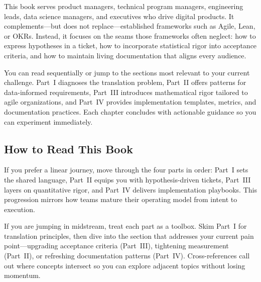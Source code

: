 \documentclass[11pt,a4paper,twoside,openright]{book}
\begin{document}
This book serves product managers, technical program managers, engineering leads, data science managers, and executives who drive digital products. It complements—but does not replace—established frameworks such as Agile, Lean, or OKRs. Instead, it focuses on the seams those frameworks often neglect: how to express hypotheses in a ticket, how to incorporate statistical rigor into acceptance criteria, and how to maintain living documentation that aligns every audience.

You can read sequentially or jump to the sections most relevant to your current challenge. Part~I diagnoses the translation problem, Part~II offers patterns for data-informed requirements, Part~III introduces mathematical rigor tailored to agile organizations, and Part~IV provides implementation templates, metrics, and documentation practices. Each chapter concludes with actionable guidance so you can experiment immediately.

\subsection*{How to Read This Book}
If you prefer a linear journey, move through the four parts in order: Part~I sets the shared language, Part~II equips you with hypothesis-driven tickets, Part~III layers on quantitative rigor, and Part~IV delivers implementation playbooks. This progression mirrors how teams mature their operating model from intent to execution.

If you are jumping in midstream, treat each part as a toolbox. Skim Part~I for translation principles, then dive into the section that addresses your current pain point—upgrading acceptance criteria (Part~III), tightening measurement (Part~II), or refreshing documentation patterns (Part~IV). Cross-references call out where concepts intersect so you can explore adjacent topics without losing momentum.

\clearpage
\end{document}
